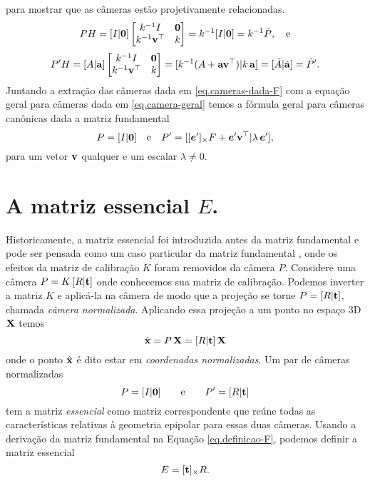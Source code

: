 para mostrar que as câmeras estão projetivamente relacionadas.
\begin{equation*}
PH=[I|{\bf 0}]
\begin{bmatrix}
k^{-1}I&{\bf 0}\\
k^{-1}{\bf v}^\top&k
\end{bmatrix}
=
k^{-1}[I|{\bf 0}]=k^{-1}\tilde{P},\quad\text{e}
\end{equation*}
\begin{equation*}
P'H=[A|{\bf a}]
\begin{bmatrix}
k^{-1}I&{\bf 0}\\
k^{-1}{\bf v}^\top&k
\end{bmatrix}
=
[k^{-1}(A+{\bf a}{\bf v}^\top)|k\,{\bf a}]
=[\tilde{A}|\tilde{{\bf a}}]=\tilde{P}'.
\end{equation*}
Juntando a extração das câmeras dada em \ref{eq.cameras-dada-F} com a equação geral para câmeras dada em \ref{eq.camera-geral} temos a fórmula geral para câmeras canônicas dada a matriz fundamental
\begin{equation*}
P=[I|{\bf 0}]\quad\text{e}\quad P'=[[\boldsymbol{e}']_\times F+\boldsymbol{e}'{\bf v}^\top |\lambda\,\boldsymbol{e}'],
\end{equation*} 
para um vetor ${\bf v}$ qualquer  e um escalar $\lambda\neq0$.
\section*{A matriz essencial $E$.}
Historicamente, a matriz essencial foi introduzida antes da matriz fundamental e pode ser pensada como um caso particular da matriz fundamental \cite{Longuet}, onde os efeitos da matriz de calibração $K$ foram removidos da câmera $P$. Considere uma câmera $P=K\,[R|{\bf t}]$ onde conhecemos sua matriz de calibração. Podemos inverter a matriz $K$ e aplicá-la na câmera de modo que a projeção se torne $P=[R|{\bf t}]$, chamada {\it câmera normalizada}. Aplicando essa projeção a um ponto no espaço 3D $\mathbf{X}$ temos 
\begin{equation*}
\hat{\mathbf{x}}=P\,\mathbf{X}=[R|{\bf t}]\,\mathbf{X}
\end{equation*}
onde o ponto $\hat{\mathbf{x}}$ é dito estar em {\it coordenadas  normalizadas}. Um par de câmeras normalizadas 
\begin{equation*}
P=[I|{\bf 0}]\qquad\text{e}\qquad P'=[R|{\bf t}]
\end{equation*}
tem a matriz {\it essencial} como matriz correspondente que reúne todas as características relativas à geometria epipolar para essas duas câmeras. Usando a derivação da matriz fundamental na Equação \ref{eq.definicao-F}, podemos definir a matriz essencial
\begin{equation*}
E=[{\bf t}]_\times R.
\end{equation*}